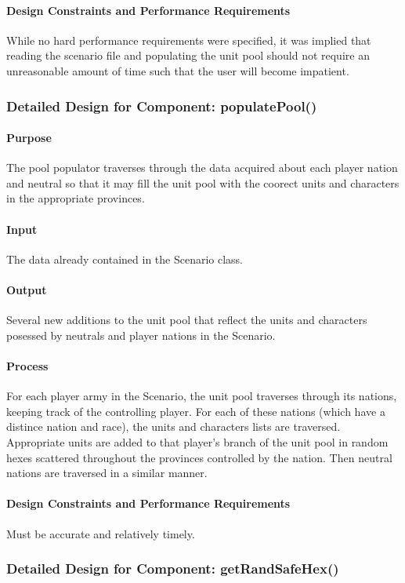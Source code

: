 \documentclass[12pt,a4paper,titlepage]{article}
\begin{document}
\paragraph{Design Constraints and Performance Requirements} While no hard performance requirements were specified, it was implied that reading the scenario file and populating the unit pool should not require an unreasonable amount of time such that the user will become impatient.

\subsubsection{Detailed Design for Component: populatePool()}
\paragraph{Purpose} The pool populator traverses through the data acquired about each player nation and neutral so that it may fill the unit pool with the coorect units and characters in the appropriate provinces.
\paragraph{Input} The data already contained in the Scenario class.
\paragraph{Output} Several new additions to the unit pool that reflect the units and characters posessed by neutrals and player nations in the Scenario.
\paragraph{Process} For each player army in the Scenario, the unit pool traverses through its nations, keeping track of the controlling player. For each of these nations (which have a distince nation and race), the units and characters lists are traversed. Appropriate units are added to that player's branch of the unit pool in random hexes scattered throughout the provinces controlled by the nation. Then neutral nations are traversed in a similar manner.
\paragraph{Design Constraints and Performance Requirements} Must be accurate and relatively timely.

\subsubsection{Detailed Design for Component: getRandSafeHex()}
\end{document}
